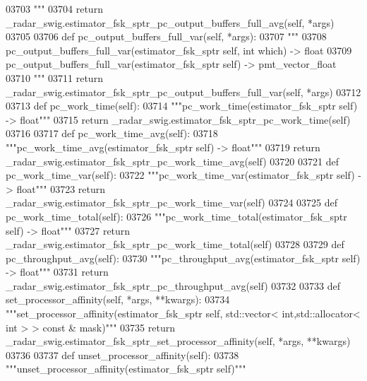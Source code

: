 \begin{DoxyCode}
{{{{{{{{{{{{{03703 \textcolor{stringliteral}{        """}
03704         \textcolor{keywordflow}{return} \_radar\_swig.estimator\_fsk\_sptr\_pc\_output\_buffers\_full\_avg(self, *args)
03705 
03706     \textcolor{keyword}{def }pc_output_buffers_full_var(self, *args):
03707         \textcolor{stringliteral}{"""}
03708 \textcolor{stringliteral}{        pc\_output\_buffers\_full\_var(estimator\_fsk\_sptr self, int which) -> float}
03709 \textcolor{stringliteral}{        pc\_output\_buffers\_full\_var(estimator\_fsk\_sptr self) -> pmt\_vector\_float}
03710 \textcolor{stringliteral}{        """}
03711         \textcolor{keywordflow}{return} \_radar\_swig.estimator\_fsk\_sptr\_pc\_output\_buffers\_full\_var(self, *args)
03712 
03713     \textcolor{keyword}{def }pc_work_time(self):
03714         \textcolor{stringliteral}{"""pc\_work\_time(estimator\_fsk\_sptr self) -> float"""}
03715         \textcolor{keywordflow}{return} \_radar\_swig.estimator\_fsk\_sptr\_pc\_work\_time(self)
03716 
03717     \textcolor{keyword}{def }pc_work_time_avg(self):
03718         \textcolor{stringliteral}{"""pc\_work\_time\_avg(estimator\_fsk\_sptr self) -> float"""}
03719         \textcolor{keywordflow}{return} \_radar\_swig.estimator\_fsk\_sptr\_pc\_work\_time\_avg(self)
03720 
03721     \textcolor{keyword}{def }pc_work_time_var(self):
03722         \textcolor{stringliteral}{"""pc\_work\_time\_var(estimator\_fsk\_sptr self) -> float"""}
03723         \textcolor{keywordflow}{return} \_radar\_swig.estimator\_fsk\_sptr\_pc\_work\_time\_var(self)
03724 
03725     \textcolor{keyword}{def }pc_work_time_total(self):
03726         \textcolor{stringliteral}{"""pc\_work\_time\_total(estimator\_fsk\_sptr self) -> float"""}
03727         \textcolor{keywordflow}{return} \_radar\_swig.estimator\_fsk\_sptr\_pc\_work\_time\_total(self)
03728 
03729     \textcolor{keyword}{def }pc_throughput_avg(self):
03730         \textcolor{stringliteral}{"""pc\_throughput\_avg(estimator\_fsk\_sptr self) -> float"""}
03731         \textcolor{keywordflow}{return} \_radar\_swig.estimator\_fsk\_sptr\_pc\_throughput\_avg(self)
03732 
03733     \textcolor{keyword}{def }set_processor_affinity(self, *args, **kwargs):
03734         \textcolor{stringliteral}{"""set\_processor\_affinity(estimator\_fsk\_sptr self, std::vector< int,std::allocator< int > > const &
       mask)"""}
03735         \textcolor{keywordflow}{return} \_radar\_swig.estimator\_fsk\_sptr\_set\_processor\_affinity(self, *args, **kwargs)
03736 
03737     \textcolor{keyword}{def }unset_processor_affinity(self):
03738         \textcolor{stringliteral}{"""unset\_processor\_affinity(estimator\_fsk\_sptr self)"""}
}}}}}}}}}}}}}
\end{DoxyCode}
